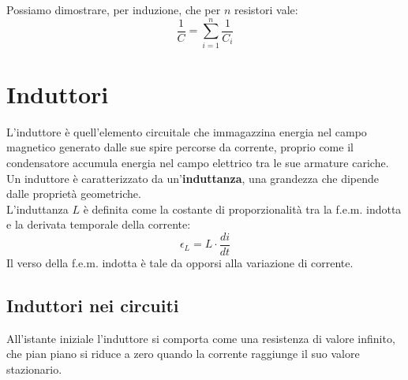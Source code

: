 Possiamo dimostrare, per induzione, che per $n$ resistori vale:
\begin{displaymath}
	\frac{1}{C} = \sum_{i=1}^n \frac{1}{C_i}
\end{displaymath}

\section{Induttori}
L'induttore è quell'elemento circuitale che immagazzina energia nel campo magnetico generato dalle sue spire percorse da corrente, proprio come il condensatore accumula energia nel campo elettrico tra le sue armature cariche.\\
Un induttore è caratterizzato da un'\textbf{induttanza}, una grandezza che dipende dalle proprietà geometriche.\\
L'induttanza $L$ è definita come la costante di proporzionalità tra la f.e.m. indotta e la derivata temporale della corrente: $$\epsilon_L = L \cdot \frac{di}{dt}$$
Il verso della f.e.m. indotta è tale da opporsi alla variazione di corrente.

\subsection{Induttori nei circuiti}
All'istante iniziale l'induttore si comporta come una resistenza di valore infinito, che pian piano si riduce a zero quando la corrente raggiunge il suo valore stazionario.\\